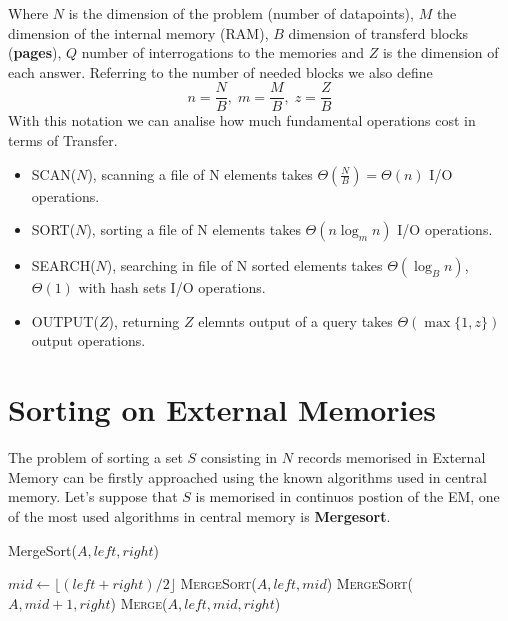 \documentclass{report}
\begin{document}
Where \(N\) is the dimension of the problem (number of datapoints), \(M\) the dimension of the internal memory (RAM), \(B\) dimension of transferd blocks (\textbf{pages}), \(Q\) number of interrogations to the memories and \(Z\) is the dimension of each answer. Referring to the number of needed blocks we also define 
\[
    n = \frac{N}{B},\; m=\frac{M}{B}, \; z = \frac{Z}{B}
\]
With this notation we can analise how much fundamental operations cost in terms of Transfer.
\begin{itemize}
    \item SCAN(\(N\)), scanning a file of N elements takes \(\Theta (\frac{N}{B}) = \Theta (n)\) I/O operations.
    \item SORT(\(N\)), sorting a file of N elements takes \(\Theta (n \log_m n)\) I/O operations.
    \item SEARCH(\(N\)), searching in file of N sorted elements takes \(\Theta(\log_B n)\), \(\Theta(1)\) with hash sets I/O operations.
    \item OUTPUT(\(Z\)), returning \(Z\) elemnts output of a query takes \(\Theta(\max \{1,z\})\) output operations.
\end{itemize}
\chapter{Sorting on External Memories}
The problem of sorting a set \(S\) consisting in \(N\) records memorised in External Memory can be firstly approached using the known algorithms used in central memory. Let's suppose that \(S\) is memorised in continuos postion of the EM, one of the most used algorithms in central memory is \textbf{Mergesort}.
\begin{algorithm}[H]
    \caption{MergeSort(\(A, left, right\))}
    \begin{algorithmic}[1]
        \State \(mid \gets \lfloor (left + right) / 2 \rfloor\)
        \State \textsc{MergeSort}(\(A, left, mid\))
        \State \textsc{MergeSort}(\(A, mid + 1, right\))
        \State \textsc{Merge}(\(A, left, mid, right\))
    \EndIf
    \end{algorithmic}
\end{algorithm}
\end{document}
